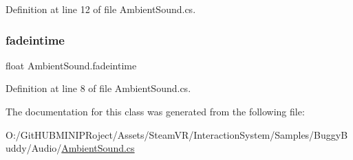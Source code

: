 Definition at line 12 of file Ambient\+Sound.\+cs.

\mbox{\label{class_ambient_sound_a75dabb50536347e547f4f16f1b23e750}} 
\subsubsection{\texorpdfstring{fadeintime}{fadeintime}}
{\footnotesize\ttfamily float Ambient\+Sound.\+fadeintime}



Definition at line 8 of file Ambient\+Sound.\+cs.



The documentation for this class was generated from the following file\+:\begin{DoxyCompactItemize}
\item 
O\+:/\+Git\+H\+U\+B\+M\+I\+N\+I\+P\+Roject/\+Assets/\+Steam\+V\+R/\+Interaction\+System/\+Samples/\+Buggy\+Buddy/\+Audio/\mbox{\hyperlink{_ambient_sound_8cs}{Ambient\+Sound.\+cs}}\end{DoxyCompactItemize}
